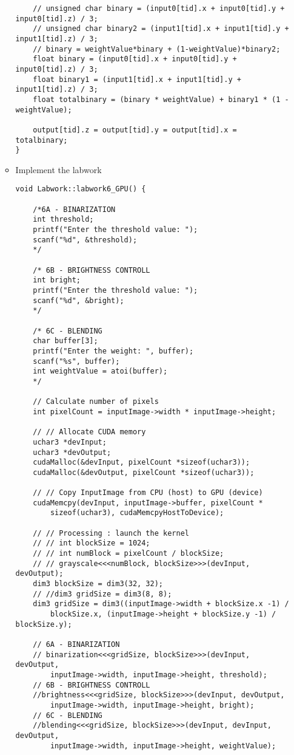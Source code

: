 \documentclass{article}
\begin{document}
\begin{enumerate}
\begin{itemize}
\begin{verbatim}
    // unsigned char binary = (input0[tid].x + input0[tid].y + input0[tid].z) / 3;
    // unsigned char binary2 = (input1[tid].x + input1[tid].y + input1[tid].z) / 3;
    // binary = weightValue*binary + (1-weightValue)*binary2;
    float binary = (input0[tid].x + input0[tid].y + input0[tid].z) / 3;
    float binary1 = (input1[tid].x + input1[tid].y + input1[tid].z) / 3;
    float totalbinary = (binary * weightValue) + binary1 * (1 - weightValue);

    output[tid].z = output[tid].y = output[tid].x = totalbinary; 
}        
    \end{verbatim}
    
    \item Implement the labwork
    \begin{verbatim}
void Labwork::labwork6_GPU() {

    /*6A - BINARIZATION
    int threshold;
    printf("Enter the threshold value: ");
    scanf("%d", &threshold);
    */

    /* 6B - BRIGHTNESS CONTROLL
    int bright;
    printf("Enter the threshold value: ");
    scanf("%d", &bright);
    */ 

    /* 6C - BLENDING
    char buffer[3];
    printf("Enter the weight: ", buffer);
    scanf("%s", buffer);
    int weightValue = atoi(buffer);
    */

    // Calculate number of pixels
    int pixelCount = inputImage->width * inputImage->height;

    // // Allocate CUDA memory
    uchar3 *devInput;
    uchar3 *devOutput;
    cudaMalloc(&devInput, pixelCount *sizeof(uchar3));
    cudaMalloc(&devOutput, pixelCount *sizeof(uchar3));

    // // Copy InputImage from CPU (host) to GPU (device)
    cudaMemcpy(devInput, inputImage->buffer, pixelCount * 
        sizeof(uchar3), cudaMemcpyHostToDevice);

    // // Processing : launch the kernel
    // // int blockSize = 1024;
    // // int numBlock = pixelCount / blockSize;  
    // // grayscale<<<numBlock, blockSize>>>(devInput, devOutput);
    dim3 blockSize = dim3(32, 32);
    // //dim3 gridSize = dim3(8, 8);
    dim3 gridSize = dim3((inputImage->width + blockSize.x -1) / 
        blockSize.x, (inputImage->height + blockSize.y -1) / blockSize.y);

    // 6A - BINARIZATION
    // binarization<<<gridSize, blockSize>>>(devInput, devOutput,
        inputImage->width, inputImage->height, threshold);
    // 6B - BRIGHTNESS CONTROLL
    //brightness<<<gridSize, blockSize>>>(devInput, devOutput, 
        inputImage->width, inputImage->height, bright);
    // 6C - BLENDING
    //blending<<<gridSize, blockSize>>>(devInput, devInput, devOutput,
        inputImage->width, inputImage->height, weightValue);


\end{verbatim}
\end{itemize}
\end{enumerate}
\end{document}
